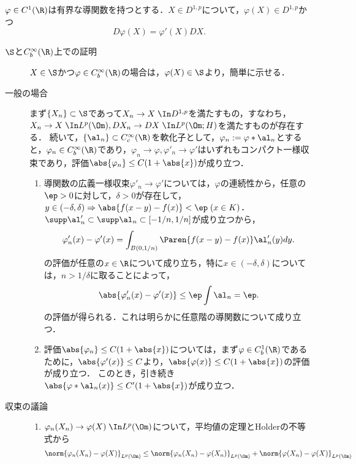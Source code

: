 \documentclass[uplatex,dvipdfmx]{jsreport}
\begin{document}
\begin{proposition}[$\al=0$の場合は議論が簡単になる \cite{Kunze13-Malliavin}]
    $\varphi\in C^1(\R)$は有界な導関数を持つとする．$X\in D^{1,p}$について，$\varphi(X)\in D^{1,p}$かつ
    \[D\varphi(X)=\varphi'(X)DX.\]
\end{proposition}
\begin{Proof}\mbox{}
    \begin{description}
        \item[$\S$と$C_b^\infty(\R)$上での証明] $X\in\S$かつ$\varphi\in C_b^\infty(\R)$の場合は，$\varphi(X)\in\S$より，簡単に示せる．
        \item[一般の場合] まず$\{X_n\}\subset\S$であって$X_n\to X\;\In D^{1,p}$を満たすもの，すなわち，$X_n\to X\;\In L^p(\Om),DX_n\to DX\;\In L^p(\Om;H)$を満たすものが存在する．
        続いて，$\{\al_n\}\subset C_c^\infty(\R)$を軟化子として，$\varphi_n:=\varphi*\al_n$とすると，$\varphi_n\in C^\infty_b(\R)$であり，$\varphi_n\to\varphi,\varphi'_n\to\varphi'$はいずれもコンパクト一様収束であり，評価$\abs{\varphi_n}\le C(1+\abs{x})$が成り立つ．
        \begin{enumerate}
            \item 導関数の広義一様収束$\varphi'_n\to\varphi'$については，$\varphi$の連続性から，任意の$\ep>0$に対して，$\delta>0$が存在して，$y\in(-\delta,\delta)\Rightarrow\abs{f(x-y)-f(x)}<\ep\;(x\in K)$．
            $\supp\al'_n\subset\supp\al_n\subset[-1/n,1/n]$が成り立つから，
            \[\varphi'_n(x)-\varphi'(x)=\int_{B(0,1/n)}\Paren{f(x-y)-f(x)}\al_n'(y)dy.\]
            の評価が任意の$x\in\R$について成り立ち，特に$x\in (-\delta,\delta)$については，$n>1/\delta$に取ることによって，
            \[\abs{\varphi'_n(x)-\varphi'(x)}\le\ep\int\al_n=\ep.\]
            の評価が得られる．これは明らかに任意階の導関数について成り立つ．
            \item 評価$\abs{\varphi_n}\le C(1+\abs{x})$については，まず$\varphi\in C_b^1(\R)$であるために，$\abs{\varphi'(x)}\le C$より，$\abs{\varphi(x)}\le C(1+\abs{x})$の評価が成り立つ．
            このとき，引き続き$\abs{\varphi*\al_n(x)}\le C'(1+\abs{x})$が成り立つ．
        \end{enumerate}
        \item[収束の議論] 
        \begin{enumerate}
            \item $\varphi_n(X_n)\to\varphi(X)\;\In L^p(\Om)$について，平均値の定理とHolderの不等式から
            \begin{align*}
                \norm{\varphi_n(X_n)-\varphi(X)}_{L^p(\Om)}&\le\norm{\varphi_n(X_n)-\varphi(X_n)}_{L^p(\Om)}+\norm{\varphi(X_n)-\varphi(X)}_{L^p(\Om)}\\

\end{align*}
\end{enumerate}
\end{description}
\end{Proof}
\end{document}
